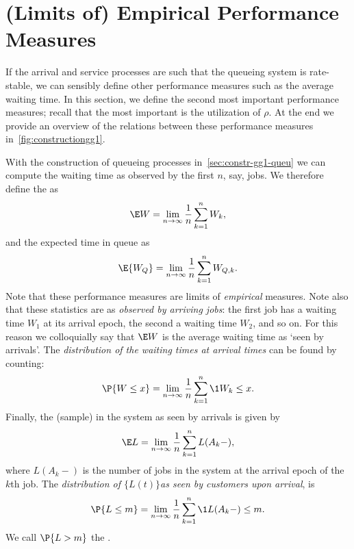 \section{(Limits of) Empirical Performance Measures}
\label{sec:limits-of-emperical}




If the arrival and service processes are such that the queueing system is rate-stable, we can sensibly define other performance measures such as the average waiting time.
In this section, we define the second most important performance measures; recall that the most important is the utilization of $\rho$.
At the end we provide an overview of the relations between these performance measures in~\cref{fig:constructiongg1}.


With the construction of queueing processes in~\cref{sec:constr-gg1-queu} we can compute the waiting time as observed by the first $n$, say, jobs.
We therefore define the  as
\begin{equation}\label{eq:49}
 \E W = \lim_{n\to\infty} \frac 1n\sum_{k=1}^n W_k,
\end{equation}
and the expected time in queue as
\begin{equation}\label{eq:50}
 \E{W_Q} = \lim_{n\to\infty} \frac 1 n\sum_{k=1}^n W_{Q,k}.
\end{equation}
Note that these performance measures are limits of \emph{empirical} measures.
Note also that these statistics are as \emph{observed by arriving jobs}: the first job has a waiting time $W_1$ at its arrival epoch, the second a waiting time $W_2$, and so on.
For this reason we colloquially say that $\E W$ is the average waiting time as `seen by arrivals'.
The \emph{distribution of the waiting times at arrival times} can be found by counting:
\begin{equation}\label{eq:48}
 \P{W \leq x} = \lim_{n\to\infty} \frac 1n\sum_{k=1}^n \1{W_k\leq x}.
\end{equation}
Finally, the (sample)  in the system as seen by arrivals is given by
\begin{equation}\label{eq:EQ}
\E L = \lim_{n\to\infty}\frac 1 n \sum_{k=1}^n L(A_k-),
\end{equation}
where $L(A_k-)$ is the number of jobs in the system at the arrival epoch of the $k$th job.
The \emph{distribution of $\{L(t)\}$as seen by customers upon arrival}, is
\begin{equation}\label{eq:Qm}
\P{L\leq m} = \lim_{n\to\infty} \frac 1 n \sum_{k=1}^n \1{L(A_k-) \leq m}.
\end{equation}
We call $\P{L > m}$ the .



